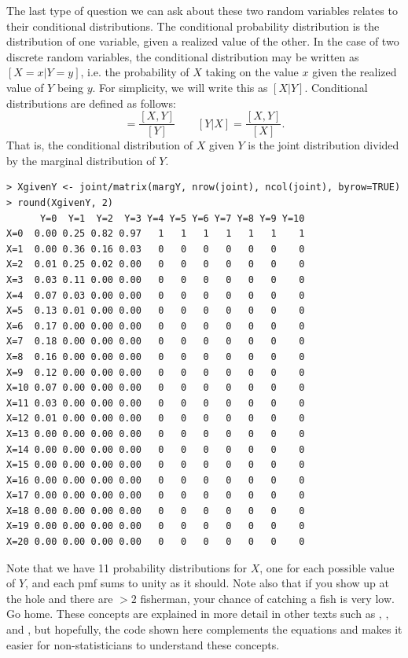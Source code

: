 The last type of question we can ask about these two random variables
relates to their conditional distributions. The
conditional probability distribution is the distribution of one
variable, given a realized value of the other. In the case of two discrete random
variables, the conditional distribution may be written as
$[X=x|Y=y]$, i.e. the probability of $X$ taking on the value $x$
given the realized value of $Y$ being $y$. For simplicity, we will
write this as $[X|Y]$. Conditional distributions are defined as follows:
\begin{equation*}
  [X|Y] = \frac{[X,Y]}{[Y]} \qquad [Y|X] = \frac{[X,Y]}{[X]}.
\end{equation*}
That is, the conditional distribution of $X$ given $Y$ is the joint
distribution divided by the marginal distribution of $Y$.
\begin{verbatim}
> XgivenY <- joint/matrix(margY, nrow(joint), ncol(joint), byrow=TRUE)
> round(XgivenY, 2)
      Y=0  Y=1  Y=2  Y=3 Y=4 Y=5 Y=6 Y=7 Y=8 Y=9 Y=10
X=0  0.00 0.25 0.82 0.97   1   1   1   1   1   1    1
X=1  0.00 0.36 0.16 0.03   0   0   0   0   0   0    0
X=2  0.01 0.25 0.02 0.00   0   0   0   0   0   0    0
X=3  0.03 0.11 0.00 0.00   0   0   0   0   0   0    0
X=4  0.07 0.03 0.00 0.00   0   0   0   0   0   0    0
X=5  0.13 0.01 0.00 0.00   0   0   0   0   0   0    0
X=6  0.17 0.00 0.00 0.00   0   0   0   0   0   0    0
X=7  0.18 0.00 0.00 0.00   0   0   0   0   0   0    0
X=8  0.16 0.00 0.00 0.00   0   0   0   0   0   0    0
X=9  0.12 0.00 0.00 0.00   0   0   0   0   0   0    0
X=10 0.07 0.00 0.00 0.00   0   0   0   0   0   0    0
X=11 0.03 0.00 0.00 0.00   0   0   0   0   0   0    0
X=12 0.01 0.00 0.00 0.00   0   0   0   0   0   0    0
X=13 0.00 0.00 0.00 0.00   0   0   0   0   0   0    0
X=14 0.00 0.00 0.00 0.00   0   0   0   0   0   0    0
X=15 0.00 0.00 0.00 0.00   0   0   0   0   0   0    0
X=16 0.00 0.00 0.00 0.00   0   0   0   0   0   0    0
X=17 0.00 0.00 0.00 0.00   0   0   0   0   0   0    0
X=18 0.00 0.00 0.00 0.00   0   0   0   0   0   0    0
X=19 0.00 0.00 0.00 0.00   0   0   0   0   0   0    0
X=20 0.00 0.00 0.00 0.00   0   0   0   0   0   0    0
\end{verbatim}
Note that we have 11 probability distributions for $X$, one for each
possible value of $Y$, and each pmf sums to unity as it should. Note
also that if you show up at the hole and there are $>2$
fisherman, your chance of catching a fish is very low. Go home.
These concepts are explained in more detail
in other texts such as \citet{casella_berger:2002},
\citet{royle_dorazio:2008}, and \citet{link_barker:2010}, but
hopefully, the code shown here complements the equations and makes it
easier for non-statisticians to understand these concepts.

